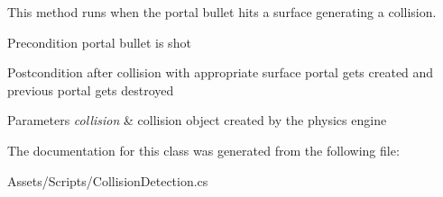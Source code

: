 This method runs when the portal bullet hits a surface generating a collision. \begin{DoxyPrecond}{Precondition}
portal bullet is shot 
\end{DoxyPrecond}
\begin{DoxyPostcond}{Postcondition}
after collision with appropriate surface portal gets created and previous portal gets destroyed 
\end{DoxyPostcond}

\begin{DoxyParams}{Parameters}
{\em collision} & collision object created by the physics engine \\
\hline
\end{DoxyParams}


The documentation for this class was generated from the following file\+:\begin{DoxyCompactItemize}
\item 
Assets/\+Scripts/Collision\+Detection.\+cs\end{DoxyCompactItemize}

